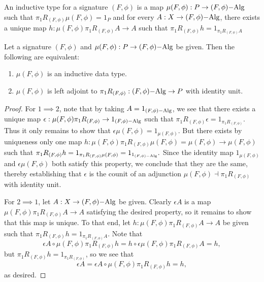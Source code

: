 \documentclass[../thesis.tex]{subfiles}
\begin{document}
\begin{definition}
  An inductive type for a signature $(F,\phi)$ is a map $\mu(F,\phi) : P \to (F,\phi)\mathrm{-Alg}$ such that
  $\pi_1 R_{(F,\phi)} \mu(F,\phi) = 1_P$ and for every $A : X \to (F,\phi)\mathrm{-Alg}$, there exists a unique
  map $h : \mu(F,\phi)\pi_1R_{(F,\phi)} A \to A$ such that $\pi_1R_{(F,\phi)} h = 1_{\pi_1R_{(F,\phi)}A}$
\end{definition}
\begin{lemma}
  Let a signature $(F,\phi)$ and $\mu(F,\phi) : P \to (F,\phi)\mathrm{-Alg}$ be given. Then the following are equivalent:
  \begin{enumerate}
    \item $\mu(F,\phi)$ is an inductive data type.
    \item $\mu(F,\phi)$ is left adjoint to $\pi_1 R_{(F,\phi)} : (F,\phi)\mathrm{-Alg} \to P$ with identity unit.
  \end{enumerate}
\end{lemma}
\begin{proof}
  For $1 \implies 2$, note that by taking $A = 1_{(F,\phi)\mathrm{-Alg}}$, we see that there exists a unique map $
  \epsilon : \mu(F,\phi)\pi_1R_{(F,\phi)} \to 1_{(F,\phi)\mathrm{-Alg}}$ such that $\pi_1 R_{(F,\phi)}\epsilon =
  1_{\pi_1 R_{(F,\phi)}}$. Thus it only remains to show that $\epsilon\mu(F,\phi) = 1_{\mu(F,\phi)}$. But
  there exists by uniqueness only one map $h : \mu(F,\phi)\pi_1R_{(F,\phi)}\mu(F,\phi) = \mu(F,\phi) \to
  \mu(F,\phi)$ such that $\pi_1 R_{(F,\phi)} h = 1_{\pi_1 R_{(F,\phi)}\mu(F,\phi)} = 1_{1_{(F,\phi)\mathrm{-Alg}}}.$
  Since the identity map $1_{\mu(F,\phi)}$ and $\epsilon\mu(F,\phi)$ both satisfy this property, we conclude
  that they are the same, thereby establishing that $\epsilon$ is the counit of an adjunction $\mu(F,\phi)
  \dashv \pi_1R_{(F,\phi)}$ with identity unit.

  For $2 \implies 1$, let $A : X \to (F,\phi)\mathrm{-Alg}$ be given. Clearly $\epsilon A$ is a map $\mu(F,\phi)\pi_1
  R_{(F,\phi)}A \to A$ satisfying the desired property, so it remains to show that this map is unique. To that
  end, let $h : \mu(F,\phi)\pi_1R_{(F,\phi)}A \to A$ be given such that $\pi_1R_{(F,\phi)}h = 1_{\pi_1R_{(F,
  \phi)}A}$. Note that
  \[\epsilon A \circ \mu(F,\phi) \pi_1 R_{(F,\phi)} h = h \circ \epsilon \mu(F,\phi)\pi_1 R_{(F,\phi)}A = h,\]
  but $\pi_1 R_{(F,\phi)} h = 1_{\pi_1 R_{(F,\phi)}}$, so we see that
  \[\epsilon A = \epsilon A \circ \mu(F,\phi)\pi_1 R_{(F,\phi)} h = h,\]
  as desired.
\end{proof}
\end{document}
